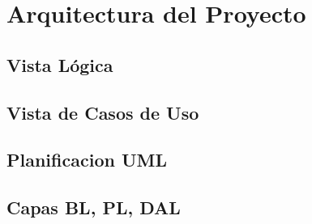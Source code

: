 \section*{Arquitectura del Proyecto}

\subsection*{Vista Lógica}

\subsection*{Vista de Casos de Uso}


\subsection*{Planificacion UML}

\subsection*{Capas BL, PL, DAL}